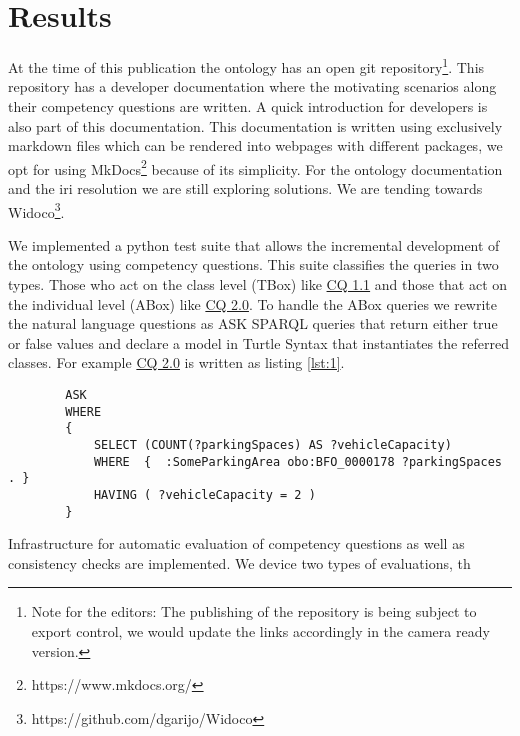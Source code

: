 \section{Results}
\label{results}

At the time of this publication the ontology has an open git
repository\footnote{Note for the editors: The publishing of the repository is
being subject to export control, we would update the links accordingly in the
camera ready version. }. This repository has a developer documentation where the
motivating scenarios along their competency questions are written. A quick
introduction for developers is also part of this documentation. This
documentation is written using exclusively markdown files which can be rendered
into webpages with different packages, we opt for using
MkDocs\footnote{https://www.mkdocs.org/} because of its simplicity. For the
ontology documentation and the iri resolution we are still exploring solutions.
We are tending towards Widoco\footnote{https://github.com/dgarijo/Widoco}.

We implemented a python test suite that allows the incremental development of
the ontology using competency questions. This suite classifies the queries in
two types. Those who act on the class level (TBox) like \hyperref[CQ1.1]{CQ 1.1}
and those that act on the individual level (ABox) like \hyperref[CQ2.0]{CQ 2.0}.
To handle the ABox queries we rewrite the natural language questions as ASK
SPARQL queries that return either true or false values and declare a model in
Turtle Syntax that instantiates the referred classes. For example
\hyperref[CQ2.0]{CQ 2.0} is written as listing \ref{lst:1}.

\begin{listing}[h]
    
    \begin{verbatim}
        ASK
        WHERE
        {
            SELECT (COUNT(?parkingSpaces) AS ?vehicleCapacity)  
            WHERE  {  :SomeParkingArea obo:BFO_0000178 ?parkingSpaces . }
            HAVING ( ?vehicleCapacity = 2 )
        }
    \end{verbatim}
    \label{lst:1}
    \caption{Example ABox query.(Given a parking area with two parking places). What is the (vehicle) capacity of parking lot P? (2). The namespaces are omitted.}

\end{listing}

Infrastructure
for automatic evaluation of competency questions as well as consistency checks
are implemented. We device two types of evaluations, th


